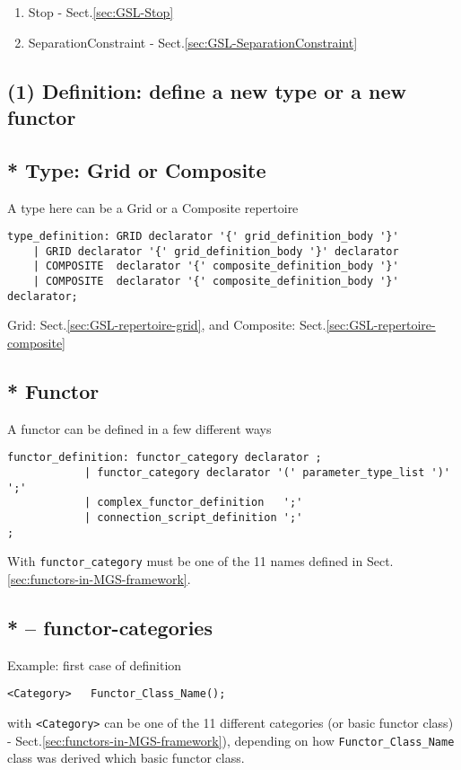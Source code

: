 \begin{enumerate}
  \item Stop - Sect.\ref{sec:GSL-Stop}
  \item SeparationConstraint - Sect.\ref{sec:GSL-SeparationConstraint}
\end{enumerate}

\subsection{(1) Definition: define a new type or a new functor}
\label{sec:gsl-definition-section}

\subsection{ * Type: Grid or Composite}

A type here can be a Grid or a Composite repertoire

\begin{verbatim}
type_definition: GRID declarator '{' grid_definition_body '}'  
	| GRID declarator '{' grid_definition_body '}' declarator 
    | COMPOSITE  declarator '{' composite_definition_body '}' 
    | COMPOSITE  declarator '{' composite_definition_body '}' declarator;
\end{verbatim}
Grid: Sect.\ref{sec:GSL-repertoire-grid}, and Composite:
Sect.\ref{sec:GSL-repertoire-composite}

\subsection{ * Functor}
\label{sec:GSL-script-functor}
\label{sec:functor-using-functor-in-GSL}

A functor can be defined in a few different ways
\begin{verbatim}
functor_definition: functor_category declarator ;
            | functor_category declarator '(' parameter_type_list ')' ';'
        	| complex_functor_definition   ';'
        	| connection_script_definition ';'
;
\end{verbatim}
With \verb!functor_category! must be one of the 11 names defined in
Sect.\ref{sec:functors-in-MGS-framework}.

\subsection{ * -- functor-categories}

Example: first case of definition
\begin{verbatim}
<Category>   Functor_Class_Name();
\end{verbatim}
with \verb!<Category>! can be one of the 11 different categories (or basic
functor class) - Sect.\ref{sec:functors-in-MGS-framework}), depending on how
\verb!Functor_Class_Name! class was derived which basic functor class.

